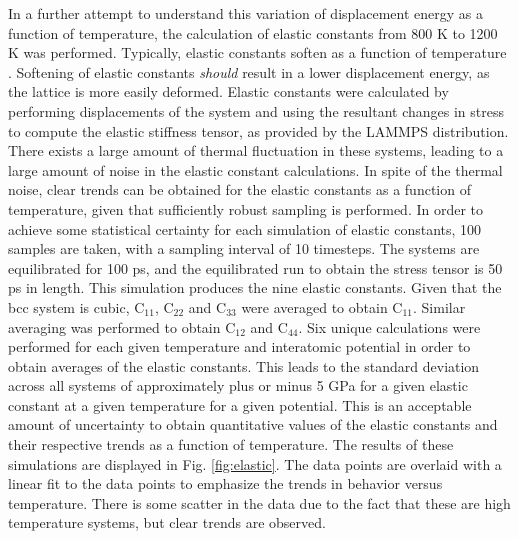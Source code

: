 \documentclass[review]{elsarticle}
\begin{document}
In a further attempt to understand this variation of displacement energy as a function of temperature, the calculation of elastic constants from 800 K to 1200 K was performed. Typically, elastic constants soften as a function of temperature \cite{varshni1970}. Softening of elastic constants \textit{should} result in a lower displacement energy, as the lattice is more easily deformed. Elastic constants were calculated by performing displacements of the system and using the resultant changes in stress to compute the elastic stiffness tensor, as provided by the LAMMPS distribution. There exists a large amount of thermal fluctuation in these systems, leading to a large amount of noise in the elastic constant calculations. In spite of the thermal noise, clear trends can be obtained for the elastic constants as a function of temperature, given that sufficiently robust sampling is performed. In order to achieve some statistical certainty for each simulation of elastic constants, 100 samples are taken, with a sampling interval of 10 timesteps. The systems are equilibrated for 100 ps, and the equilibrated run to obtain the stress tensor is 50 ps in length. This simulation produces the nine elastic constants. Given that the bcc system is cubic, C$_{11}$, C$_{22}$ and C$_{33}$ were averaged to obtain C$_{11}$. Similar averaging was performed to obtain C$_{12}$ and C$_{44}$. Six unique calculations were performed for each given temperature and interatomic potential in order to obtain averages of the elastic constants. This leads to the standard deviation across all systems of approximately plus or minus 5 GPa for a given elastic constant at a given temperature for a given potential. This is an acceptable amount of uncertainty to obtain quantitative values of the elastic constants and their respective trends as a function of temperature. The results of these simulations are displayed in Fig. \ref{fig:elastic}. The data points are overlaid with a linear fit to the data points to emphasize the trends in behavior versus temperature. There is some scatter in the data due to the fact that these are high temperature systems, but clear trends are observed. 
\end{document}
